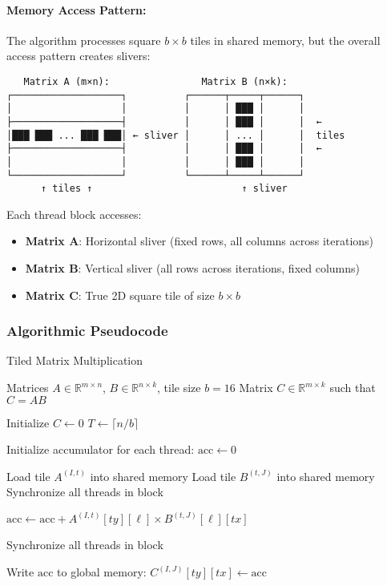 \documentclass{amsbook}
\theoremstyle{definition}
\begin{document}
\paragraph{Memory Access Pattern:} The algorithm processes square $b \times b$ tiles in shared memory, but the overall access pattern creates slivers:

\begin{center}
    \begin{verbatim}
   Matrix A (m×n):                Matrix B (n×k):
┌───────────────────┐          ┌──────┬─────┬──────┐
│                   │          │      │ ███ │      │
├───────────────────┤          │      │ ███ │      │  ←
│███ ███ ... ███ ███│ ← sliver │      │ ... │      │  tiles
├───────────────────┤          │      │ ███ │      │  ←
│                   │          │      │ ███ │      │
└───────────────────┘          └──────┴─────┴──────┘
      ↑ tiles ↑                          ↑ sliver
    \end{verbatim}
\end{center}

Each thread block accesses:
\begin{itemize}
\item \textbf{Matrix A}: Horizontal sliver (fixed rows, all columns across iterations)
\item \textbf{Matrix B}: Vertical sliver (all rows across iterations, fixed columns)
\item \textbf{Matrix C}: True 2D square tile of size $b \times b$
\end{itemize}

\subsubsection{Algorithmic Pseudocode}

\begin{algorithm}
\caption{Tiled Matrix Multiplication}
\begin{algorithmic}[1]
\Require Matrices $A \in \mathbb{R}^{m \times n}$, $B \in \mathbb{R}^{n \times k}$, tile size $b = 16$
\Ensure Matrix $C \in \mathbb{R}^{m \times k}$ such that $C = AB$

\State Initialize $C \leftarrow 0$
\State $T \leftarrow \lceil n/b \rceil$

    \State Initialize accumulator for each thread: $\text{acc} \leftarrow 0$

        \State Load tile $A^{(I,t)}$ into shared memory
        \State Load tile $B^{(t,J)}$ into shared memory
        \State Synchronize all threads in block

            \State $\text{acc} \leftarrow \text{acc} + A^{(I,t)}[ty][\ell] \times B^{(t,J)}[\ell][tx]$
        \EndFor

        \State Synchronize all threads in block
    \EndFor

    \State Write $\text{acc}$ to global memory: $C^{(I,J)}[ty][tx] \leftarrow \text{acc}$
\EndFor
\end{algorithmic}
\end{algorithm}
\end{document}
